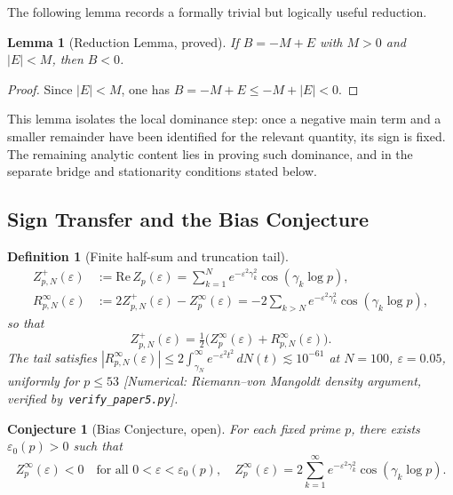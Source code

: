 \documentclass[11pt]{article}
\newtheorem{lemma}[theorem]{Lemma}
\newtheorem{definition}[theorem]{Definition}
\newtheorem{conjecture}[theorem]{Conjecture}
\begin{document}
The following lemma records a formally trivial but logically
useful reduction.

\begin{lemma}[Reduction Lemma, proved]
\label{lem:reduction}
If $B = -M + E$ with $M>0$ and $|E|<M$, then $B<0$.
\end{lemma}

\begin{proof}
Since $|E|<M$, one has $B=-M+E\leq -M+|E|<0$.
\end{proof}

This lemma isolates the local dominance step: once a negative main
term and a smaller remainder have been identified for the relevant
quantity, its sign is fixed. The remaining analytic content lies in
proving such dominance, and in the separate bridge and stationarity
conditions stated below.

\subsection{Sign Transfer and the Bias Conjecture}
\label{ssec:sign}

\begin{definition}[Finite half-sum and truncation tail]\label{def:trunc}
\begin{align*}
Z_{p,N}^{+}(\varepsilon) &:= \mathrm{Re}\,Z_p(\varepsilon)
  = \sum_{k=1}^N e^{-\varepsilon^2\gamma_k^2}
    \cos(\gamma_k\log p), \\[4pt]
R_{p,N}^{\infty}(\varepsilon)
  &:= 2Z_{p,N}^{+}(\varepsilon) - Z_p^\infty(\varepsilon)
   = -2\sum_{k>N} e^{-\varepsilon^2\gamma_k^2}
     \cos(\gamma_k\log p),
\end{align*}
so that
\[
Z_{p,N}^{+}(\varepsilon)
= \tfrac{1}{2}\bigl(Z_p^\infty(\varepsilon)
  + R_{p,N}^{\infty}(\varepsilon)\bigr).
\]
The tail satisfies
$|R_{p,N}^{\infty}(\varepsilon)| \leq 2\int_{\gamma_N}^{\infty}
e^{-\varepsilon^2 t^2}\,dN(t) \lesssim 10^{-61}$
at $N=100$, $\varepsilon=0.05$, uniformly for $p\leq 53$
[Numerical: Riemann--von Mangoldt density argument,
verified by~\texttt{verify\_paper5.py}].
\end{definition}

\begin{conjecture}[Bias Conjecture, open]
\label{conj:bias}
For each fixed prime $p$, there exists $\varepsilon_0(p)>0$ such that
\[
Z_p^\infty(\varepsilon) < 0
\quad\text{for all } 0 < \varepsilon < \varepsilon_0(p),
\quad
Z_p^\infty(\varepsilon)
  = 2\!\sum_{k=1}^\infty e^{-\varepsilon^2\gamma_k^2}
    \cos(\gamma_k\log p).
\]
\end{conjecture}
\end{document}
